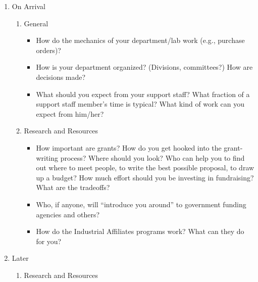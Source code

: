\begin{enumerate}
\begin{enumerate}
\begin{itemize}
\item
	What is the normal teaching load in your department?
\end{itemize}

\end{enumerate}

\item
On Arrival


\begin{enumerate}
\item
 General


\begin{itemize}\item
	How do the mechanics of your department/lab work (e.g., purchase orders)?
\item
	How is your department organized? (Divisions, committees?) How are decisions 
made?
\item
	What should you expect from your support staff? What fraction of a support staff 
member's time is typical? What kind of work can you expect from him/her?
\end{itemize}

\item
 Research and Resources


\begin{itemize}\item
	How important are grants? How do you get hooked into the grant-writing process?   
Where should you look? Who can help you to find out where to meet people, to 
write the best possible proposal, to draw up a budget? How much effort should you 
be investing in fundraising? What are the tradeoffs?
\item
	Who, if anyone, will ``introduce you around'' to government funding agencies and 
others?
\item
	How do the Industrial Affiliates programs work? What can they do for you?
\end{itemize}
\end{enumerate}

\item
 Later


\begin{enumerate}
\item
Research and Resources



\end{enumerate}
\end{enumerate}
